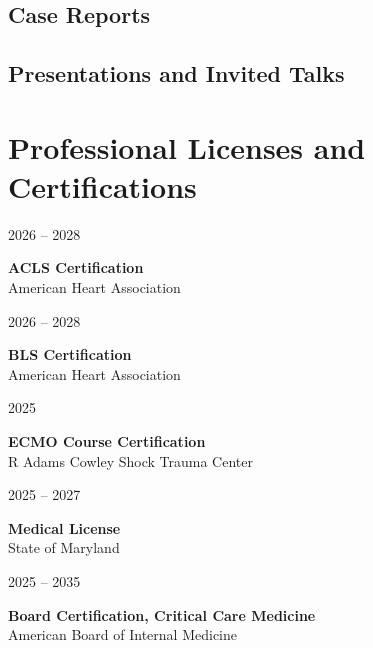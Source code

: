\documentclass{article}
\newcommand\colleft{.20}
\newcommand\colright{.75}
\newcommand{\entryfour}[4]
	{
		\begin{minipage}[t]{\colleft\textwidth}
		\hfill \textsc{#1}
		\end{minipage}
		\hfill\vline\hfill
		\begin{minipage}[t]{\colright\textwidth}
		{\bf#2}\\
		\textit{#3}
		\footnotesize{#4}
		\end{minipage}\\
		\entryvspace
	}%
\newcommand{\entrythree}[3]
{
	\begin{minipage}[t]{\colleft\textwidth}
		\hfill \textsc{#1}
	\end{minipage}
	\hfill\vline\hfill
	\begin{minipage}[t]{\colright\textwidth}
		{\bf#2}\\
		\footnotesize{#3}
	\end{minipage}
	\entryvspace
}%
\newcommand{\entryvspace}{\vspace{0.5em}}
\begin{document}
	\subsection*{Case Reports}
		\printbibliography[keyword=caseRep, heading=none,resetnumbers]
  \subsection*{Presentations and Invited Talks}
	  \printbibliography[keyword=presentation, heading=none, resetnumbers]
	
	
	\section*{Professional Licenses and Certifications}
		\entrythree{2026 -- 2028}{ACLS Certification}{American Heart Association}
		
		\entrythree{2026 -- 2028}{BLS Certification}{American Heart Association}
		
		\entrythree{2025}{ECMO Course Certification}{R Adams Cowley Shock Trauma Center}
	
		\entrythree{2025 -- 2027}{Medical License}{State of Maryland}
		
		\entrythree{2025 -- 2035}{Board Certification, Critical Care Medicine}{American Board of Internal Medicine}
		
\end{document}
